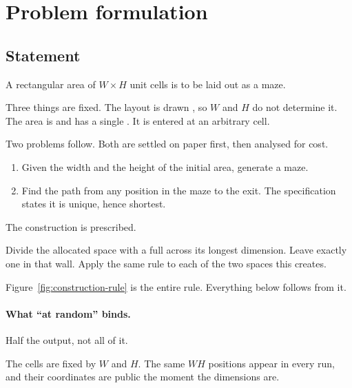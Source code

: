 \section{Problem formulation}
\label{sec:problem-formulation}

\subsection{Statement}

A rectangular area of $W\times H$ unit cells is to be laid out as a maze.

Three things are fixed. The layout is drawn , so $W$ and $H$
do not determine it. The area is  and has a single
. It is entered at an arbitrary cell.

Two problems follow. Both are settled on paper first, then analysed for cost.

\begin{enumerate}[label=\arabic*.,leftmargin=*,itemsep=2pt]
  \item Given the width and the height of the initial area, generate a maze.
  \item Find the path from any position in the maze to the exit. The
        specification states it is unique, hence shortest.
\end{enumerate}

The construction is prescribed.

\begin{keypoint}
Divide the allocated space with a full  across its longest
dimension. Leave exactly one  in that wall. Apply the same rule
to each of the two spaces this creates.
\end{keypoint}

Figure~\ref{fig:construction-rule} is the entire rule. Everything below follows
from it.



\paragraph{What ``at random'' binds.}
Half the output, not all of it.

The cells are fixed by $W$ and $H$. The same $WH$ positions appear in every run,
and their coordinates are public the moment the dimensions are.

